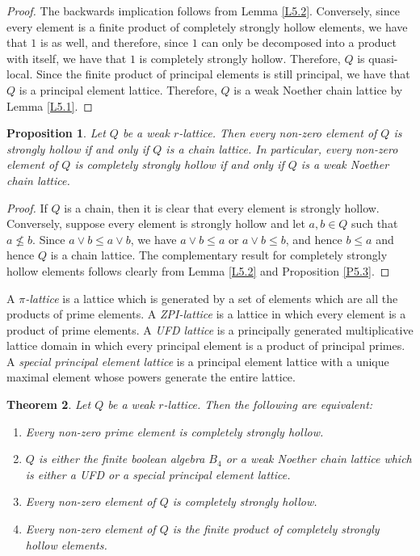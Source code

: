 \documentclass[11pt,english]{amsart}
\newtheorem{theorem}{Theorem}[section]
\newtheorem{proposition}[theorem]{Proposition}
\theoremstyle{definition}
\numberwithin{equation}{section}
\theoremstyle{remark}
\def\leq{\leqslant}
\begin{document}
	\begin{proof}
		The backwards implication follows from Lemma \ref{L5.2}. Conversely, since every element is a finite product of completely strongly hollow elements, we have that $1$ is as well, and therefore, since $1$ can only be decomposed into a product with itself, we have that $1$ is completely strongly hollow. Therefore, $Q$ is quasi-local. Since the finite product of principal elements is still principal, we have that $Q$ is a principal element lattice. Therefore, $Q$ is a weak Noether chain lattice by Lemma \ref{L5.1}.
	\end{proof}
	
	\begin{proposition}\label{P5.4}
		Let $Q$ be a weak $r$-lattice. Then every non-zero element of $Q$ is strongly hollow if and only if $Q$ is a chain lattice. In particular, every non-zero element of $Q$ is completely strongly hollow if and only if $Q$ is a weak Noether chain lattice.
	\end{proposition}
	
	\begin{proof}
		If $Q$ is a chain,  then it is clear that every element is strongly hollow. Conversely, suppose every element is strongly hollow and let $a,b\in Q$ such that $a\nleq b$. Since $a\vee b\leq a\vee b$, we have $a\vee b\leq a$ or $a\vee b\leq b$, and hence $b\leq a$ and hence $Q$ is a chain lattice. The complementary result for completely strongly hollow elements follows clearly from Lemma \ref{L5.2} and Proposition \ref{P5.3}.
	\end{proof}
	
	A \emph{$\pi$-lattice} is a lattice which is generated by a set of elements which are all the products of prime elements. A \emph{ZPI-lattice} is a lattice in which every element is a product of prime elements. A \emph{UFD lattice} is a principally generated multiplicative lattice domain in which every principal element is a product of principal primes. A \emph{special principal element lattice} is a principal element lattice with a unique maximal element whose powers generate the entire lattice.
	
	\begin{theorem}\label{T5.5}
		Let $Q$ be a weak $r$-lattice. Then the following are equivalent:
		
		\begin{enumerate}
			\item Every non-zero prime element is completely strongly hollow.
			
			\item $Q$ is either the finite boolean algebra $B_4$ or a weak Noether chain lattice which is either a UFD or a special principal element lattice.
			
			\item Every non-zero element of $Q$ is completely strongly hollow.
			
			\item Every non-zero element of $Q$ is the finite product of completely strongly hollow elements.
		\end{enumerate}
	\end{theorem}
	
\end{document}
